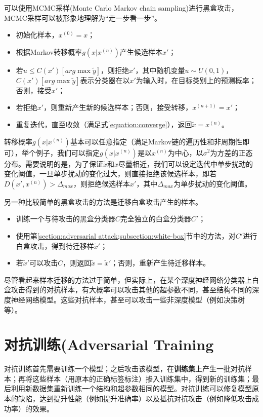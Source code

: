 \documentclass[journal, a4paper]{IEEEtran}
\begin{document}
可以使用MCMC采样(Monte Carlo Markov chain sampling)进行黑盒攻击，MCMC采样可以被形象地理解为``走一步看一步''。

\begin{itemize}
    \item 初始化样本，$x^{(0)}=x$；
    \item 根据Markov转移概率$g(x|x^{(n)})$产生候选样本$x'$；
    \item 若$u\le C(x')[arg\max \tilde y]$，则拒绝$x'$，其中随机变量$u\sim U(0,1)$，$C(x')[arg\max \tilde y]$表示分类器在以$x'$为输入时，在目标类别上的预测概率；否则，接受$x'$；
    \item 若拒绝$x'$，则重新产生新的候选样本；否则，接受转移，$x^{(n+1)}=x'$；
    \item 重复迭代，直至收敛（满足式\ref{equation:converge}），返回$\tilde x=x^{(n)}$。
\end{itemize}

转移概率$g(x|x^{(n)})$基本可以任意指定（满足Markov链的遍历性和非周期性即可），举个例子，我们可以指定$g(x|x^{(n)})$是以$x^{(n)}$为中心，以$\sigma^2$为方差的正态分布。需要说明的是，为了保证$\tilde x$和$x$尽量相近，我们可以设定迭代中单步扰动的变化阈值，一旦单步扰动的变化过大，则直接拒绝该候选样本，即若$D(x',x^{(n)})>\Delta_{max}$，则拒绝候选样本$x'$，其中$\Delta_{max}$为单步扰动的变化阈值。

另一种比较简单的黑盒攻击的方法是迁移白盒攻击产生的样本。

\begin{itemize}
    \item 训练一个与待攻击的黑盒分类器$C$完全独立的白盒分类器$C'$；
    \item 使用第\ref{section:adversarial attack;subsection:white-box}节中的方法，对$C'$进行白盒攻击，得到待迁移样$\tilde x'$；
    \item 若$\tilde x'$可以攻击$C$，则返回$\tilde x=\tilde x'$；否则，重新产生待迁移样本。
\end{itemize}

尽管看起来样本迁移的方法过于简单，但实际上，在某个深度神经网络分类器上白盒攻击得到的对抗样本，有大概率可以攻击其他的超参数不同，甚至结构不同的深度神经网络模型。这些对抗样本，甚至可以攻击一些非深度模型（例如决策树等）。

\section{对抗训练(Adversarial Training}
\label{section:adversarial training}

对抗训练首先需要训练一个模型；之后攻击该模型，在\textbf{训练集}上产生一批对抗样本；再将这些样本（用原本的正确标签标注）掺入训练集中，得到新的训练集；最后利用新数据集重新训练一个结构和超参数相同的模型。对抗训练可以修复模型原本的缺陷，达到提升性能（例如提升准确率）以及抵抗对抗攻击（例如降低攻击成功率）的效果。
\end{document}
